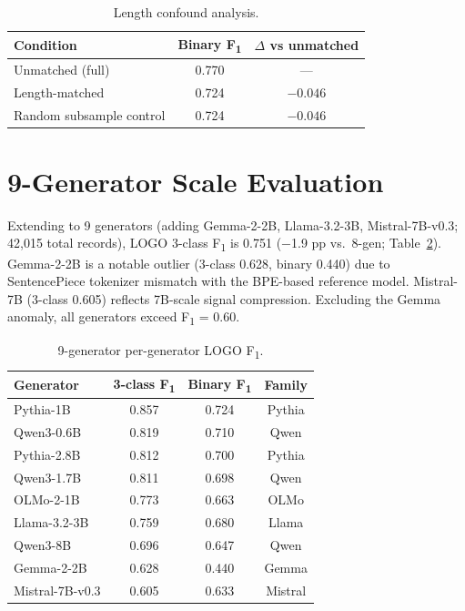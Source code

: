 \documentclass[11pt,a4paper]{article}
\newcommand{\fone}{F\textsubscript{1}}
\begin{document}
\begin{table}[h]
\centering
\caption{Length confound analysis.}
\label{tab:length}
\begin{tabular}{lcc}
\toprule
\textbf{Condition} & \textbf{Binary \fone{}} & $\Delta$ \textbf{vs unmatched} \\
\midrule
Unmatched (full) & 0.770 & --- \\
Length-matched & 0.724 & $-0.046$ \\
Random subsample control & 0.724 & $-0.046$ \\
\bottomrule
\end{tabular}
\end{table}

\section{9-Generator Scale Evaluation}
\label{app:9gen}

Extending to 9 generators (adding Gemma-2-2B, Llama-3.2-3B, Mistral-7B-v0.3; 42,015 total records),
LOGO 3-class \fone{} is 0.751 ($-$1.9 pp vs.\ 8-gen; Table~\ref{tab:9gen}).
Gemma-2-2B is a notable outlier (3-class 0.628, binary 0.440) due to SentencePiece tokenizer mismatch with the BPE-based reference model.
Mistral-7B (3-class 0.605) reflects 7B-scale signal compression.
Excluding the Gemma anomaly, all generators exceed \fone{} = 0.60.

\begin{table}[h]
\centering
\caption{9-generator per-generator LOGO \fone{}.}
\label{tab:9gen}
\small
\begin{tabular}{lccc}
\toprule
\textbf{Generator} & \textbf{3-class \fone{}} & \textbf{Binary \fone{}} & \textbf{Family} \\
\midrule
Pythia-1B & 0.857 & 0.724 & Pythia \\
Qwen3-0.6B & 0.819 & 0.710 & Qwen \\
Pythia-2.8B & 0.812 & 0.700 & Pythia \\
Qwen3-1.7B & 0.811 & 0.698 & Qwen \\
OLMo-2-1B & 0.773 & 0.663 & OLMo \\
Llama-3.2-3B & 0.759 & 0.680 & Llama \\
Qwen3-8B & 0.696 & 0.647 & Qwen \\
Gemma-2-2B & 0.628 & 0.440 & Gemma \\
Mistral-7B-v0.3 & 0.605 & 0.633 & Mistral \\
\bottomrule
\end{tabular}
\end{table}
\end{document}
